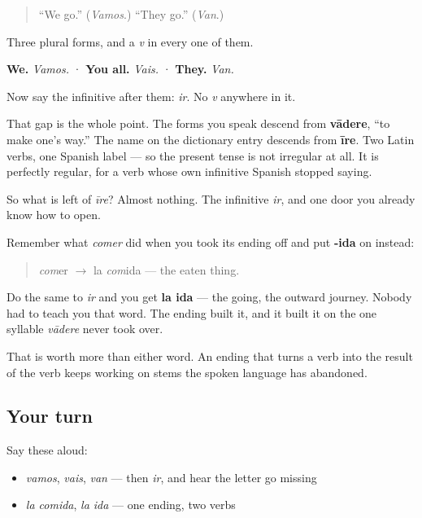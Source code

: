 \label{lesson:ES-C44-repaso-ir-ida}



\begin{quote}
\textquotedblleft{}We go.\textquotedblright{} (\emph{Vamos}.) \textquotedblleft{}They go.\textquotedblright{} (\emph{Van}.)
\end{quote}

\begin{grammarlens}[title={What you've built}]
Three plural forms, and a \emph{v} in every one of them.

\textbf{We.} \emph{Vamos.}  ·  \textbf{You all.} \emph{Vais.}  ·  \textbf{They.} \emph{Van.}

Now say the infinitive after them: \emph{ir}. No \emph{v} anywhere in it.

That gap is the whole point. The forms you speak descend from \textbf{vādere}, \textquotedblleft{}to make one's way.\textquotedblright{} The name on the dictionary entry descends from \textbf{īre}. Two Latin verbs, one Spanish label — so the present tense is not irregular at all. It is perfectly regular, for a verb whose own infinitive Spanish stopped saying.
\end{grammarlens}

\begin{culture}
So what is left of \emph{īre}? Almost nothing. The infinitive \emph{ir}, and one door you already know how to open.

Remember what \emph{comer} did when you took its ending off and put \textbf{-ida} on instead:

\begin{quote}
\emph{com}er $\to$ la \emph{com}ida — the eaten thing.
\end{quote}

Do the same to \emph{ir} and you get \textbf{la ida} — the going, the outward journey. Nobody had to teach you that word. The ending built it, and it built it on the one syllable \emph{vādere} never took over.

That is worth more than either word. An ending that turns a verb into the result of the verb keeps working on stems the spoken language has abandoned.
\end{culture}

\subsection*{Your turn}
Say these aloud:

\begin{itemize}
\raggedright
  \item \emph{vamos}, \emph{vais}, \emph{van} — then \emph{ir}, and hear the letter go missing
  \item \emph{la comida}, \emph{la ida} — one ending, two verbs
\end{itemize}

